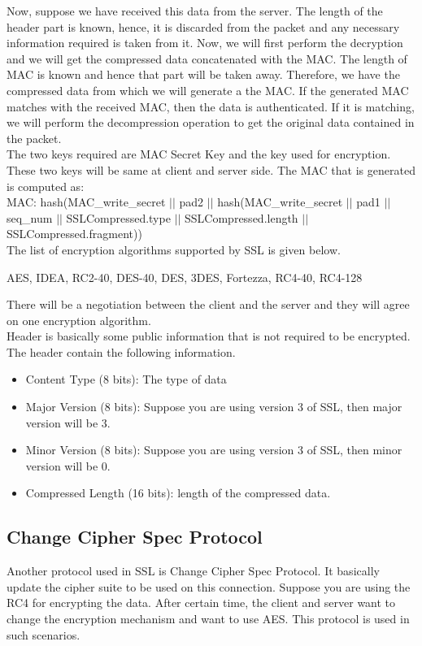 \documentclass[11pt]{article}
\begin{document}
Now, suppose we have received this data from the server. The length of the header part is known, hence, it is discarded from the packet and any necessary information required is taken from it. Now, we will first perform the decryption and we will get the compressed data concatenated with the MAC. The length of MAC is known and hence that part will be taken away. Therefore, we have the compressed data from which we will generate a the MAC. If the generated MAC matches with the received MAC, then the data is authenticated. If it is matching, we will perform the decompression operation to get the original data contained in the packet.\\
\newline
The two keys required are MAC Secret Key and the key used for encryption. These two keys will be same at client and server side. The MAC that is generated is computed as:\\
MAC: hash(MAC\_write\_secret $||$  pad2  $||$ hash(MAC\_write\_secret $||$  pad1 $||$ seq\_num $||$ SSLCompressed.type $||$ SSLCompressed.length $||$ SSLCompressed.fragment))\\
\newline
The list of encryption algorithms supported by SSL is given below.
\begin{center}
    AES, IDEA, RC2-40, DES-40, DES, 3DES, Fortezza, RC4-40, RC4-128
\end{center}
There will be a negotiation between the client and the server and they will agree on one encryption algorithm.\\
\newline
Header is basically some public information that is not required to be encrypted. The header contain the following information.
\begin{itemize}
    \item Content Type (8 bits): The type of data
    \item Major Version (8 bits): Suppose you are using version 3 of SSL, then major version will be 3.
    \item Minor Version (8 bits): Suppose you are using version 3 of SSL, then minor version will be 0.
    \item Compressed Length (16 bits): length of the compressed data.
\end{itemize}

\subsection{Change Cipher Spec Protocol}
 Another protocol used in SSL is Change Cipher Spec Protocol. It basically update the cipher suite to be used on this connection. Suppose you are using the RC4 for encrypting the data. After certain time, the client and server want to change the encryption mechanism and want to use AES. This protocol is used in such scenarios.
\end{document}
